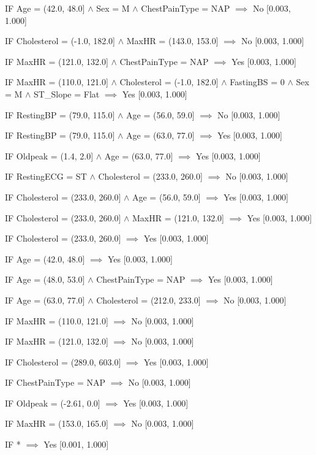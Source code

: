 IF Age = (42.0, 48.0] $\land$ Sex = M $\land$ ChestPainType = NAP $\implies$ No [0.003, 1.000]

IF Cholesterol = (-1.0, 182.0] $\land$ MaxHR = (143.0, 153.0] $\implies$ No [0.003, 1.000]

IF MaxHR = (121.0, 132.0] $\land$ ChestPainType = NAP $\implies$ Yes [0.003, 1.000]

IF MaxHR = (110.0, 121.0] $\land$ Cholesterol = (-1.0, 182.0] $\land$ FastingBS = 0 $\land$ Sex = M $\land$ ST\_Slope = Flat $\implies$ Yes [0.003, 1.000]

IF RestingBP = (79.0, 115.0] $\land$ Age = (56.0, 59.0] $\implies$ No [0.003, 1.000]

IF RestingBP = (79.0, 115.0] $\land$ Age = (63.0, 77.0] $\implies$ Yes [0.003, 1.000]

IF Oldpeak = (1.4, 2.0] $\land$ Age = (63.0, 77.0] $\implies$ Yes [0.003, 1.000]

IF RestingECG = ST $\land$ Cholesterol = (233.0, 260.0] $\implies$ No [0.003, 1.000]

IF Cholesterol = (233.0, 260.0] $\land$ Age = (56.0, 59.0] $\implies$ Yes [0.003, 1.000]

IF Cholesterol = (233.0, 260.0] $\land$ MaxHR = (121.0, 132.0] $\implies$ Yes [0.003, 1.000]

IF Cholesterol = (233.0, 260.0] $\implies$ Yes [0.003, 1.000]

IF Age = (42.0, 48.0] $\implies$ Yes [0.003, 1.000]

IF Age = (48.0, 53.0] $\land$ ChestPainType = NAP $\implies$ Yes [0.003, 1.000]

IF Age = (63.0, 77.0] $\land$ Cholesterol = (212.0, 233.0] $\implies$ No [0.003, 1.000]

IF MaxHR = (110.0, 121.0] $\implies$ No [0.003, 1.000]

IF MaxHR = (121.0, 132.0] $\implies$ No [0.003, 1.000]

IF Cholesterol = (289.0, 603.0] $\implies$ Yes [0.003, 1.000]

IF ChestPainType = NAP $\implies$ No [0.003, 1.000]

IF Oldpeak = (-2.61, 0.0] $\implies$ Yes [0.003, 1.000]

IF MaxHR = (153.0, 165.0] $\implies$ No [0.003, 1.000]

IF * $\implies$ Yes [0.001, 1.000]
